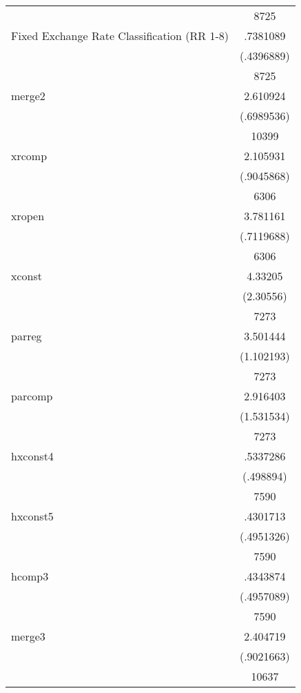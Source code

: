 {\begin{longtable}{l*{1}{c}}
                    &        8725\\
Fixed Exchange Rate Classification (RR 1-8)&    .7381089\\
                    &  (.4396889)\\
                    &        8725\\
merge2              &    2.610924\\
                    &  (.6989536)\\
                    &       10399\\
xrcomp              &    2.105931\\
                    &  (.9045868)\\
                    &        6306\\
xropen              &    3.781161\\
                    &  (.7119688)\\
                    &        6306\\
xconst              &     4.33205\\
                    &   (2.30556)\\
                    &        7273\\
parreg              &    3.501444\\
                    &  (1.102193)\\
                    &        7273\\
parcomp             &    2.916403\\
                    &  (1.531534)\\
                    &        7273\\
hxconst4            &    .5337286\\
                    &   (.498894)\\
                    &        7590\\
hxconst5            &    .4301713\\
                    &  (.4951326)\\
                    &        7590\\
hcomp3              &    .4343874\\
                    &  (.4957089)\\
                    &        7590\\
merge3              &    2.404719\\
                    &  (.9021663)\\
                    &       10637\\

\end{longtable}}
